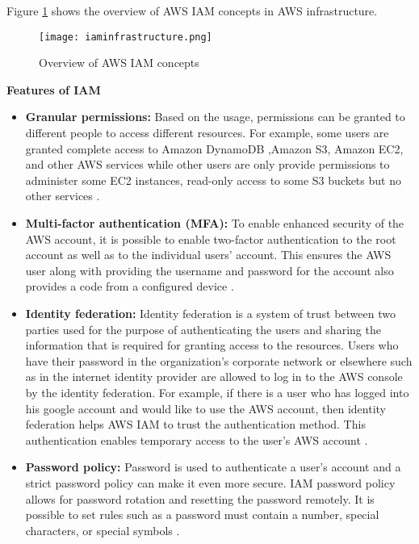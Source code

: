 Figure \ref{fig:iamidentities} shows the overview of AWS IAM concepts in AWS infrastructure.


\begin{figure}
    \centering
    \texttt{[image: iaminfrastructure.png]}
    \caption{Overview of AWS IAM concepts}
    \label{fig:iamidentities}
\end{figure}


\hfill \break

\textbf{Features of IAM}

\begin{itemize}
    \item \textbf{Granular permissions:} Based on the usage, permissions can be granted to different people to access
    different resources. For example, some users are granted complete access to Amazon DynamoDB ,Amazon S3, Amazon EC2, and other AWS services while other users are only
    provide permissions to administer some EC2 instances, read-only access to some S3 buckets but no other services \cite{25}.
\end{itemize}
\begin{itemize}
    \item \textbf{Multi-factor authentication (MFA):} To enable enhanced security of the AWS account, it is possible
    to enable
    two-factor authentication to the root account as well as to the individual users’ account. This ensures the AWS user along with providing the username and password for the account also provides a code from a configured device \cite{25}.
\end{itemize}
\begin{itemize}
    \item \textbf{Identity federation:} Identity federation is a system of trust between two parties used for the purpose of authenticating the users and sharing the information that is required for granting access to the resources.
    Users who have their password in the organization's
    corporate network or elsewhere such as in the
    internet identity provider are allowed to log in to the AWS console by the identity federation.
    For example, if there is a user who has logged into his
    google account and would like to use the AWS account,
    then identity federation helps AWS IAM to trust the authentication method.
    This authentication enables temporary access to the user’s AWS account \cite{25}.
\end{itemize}
\begin{itemize}
    \item \textbf{Password policy:} Password is used to authenticate a user’s account and a strict password policy
    can make it
    even more secure. IAM password policy allows for password rotation and resetting the password remotely. It is
    possible to set rules such as a password must contain a number, special characters, or special symbols \cite{25}.
\end{itemize}


